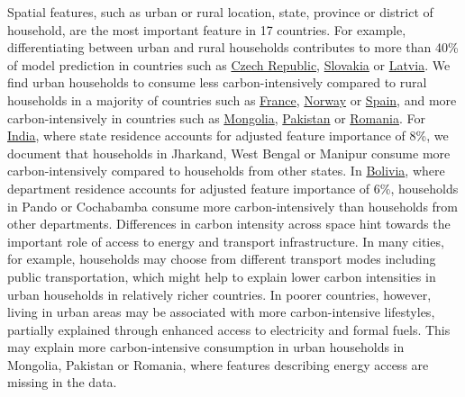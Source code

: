 \documentclass[12pt, a4paper]{article}
\begin{document}
Spatial features, such as urban or rural location, state, province or district of household, are the most important feature in 17 countries. For example, differentiating between urban and rural households contributes to more than 40\% of model prediction in countries such as \hyperref[fig:5b_CZE]{Czech Republic}, \hyperref[fig:5b_SVK]{Slovakia} or \hyperref[fig:5b_LVA]{Latvia}. We find urban households to consume less carbon-intensively compared to rural households in a majority of countries such as \hyperref[fig:5b_FRA]{France}, \hyperref[fig:5b_NOR]{Norway} or \hyperref[fig:5b_ESP]{Spain}, and more carbon-intensively in countries such as \hyperref[fig:5b_MNG]{Mongolia}, \hyperref[fig:5b_PAK]{Pakistan} or \hyperref[fig:5b_ROU]{Romania}. For \hyperref[fig:5b_IND]{India}, where state residence accounts for adjusted feature importance of 8\%, we document that households in Jharkand, West Bengal or Manipur consume more carbon-intensively compared to households from other states. In \hyperref[fig:5b_BOL]{Bolivia}, where department residence accounts for adjusted feature importance of 6\%, households in Pando or Cochabamba consume more carbon-intensively than households from other departments. Differences in carbon intensity across space hint towards the important role of access to energy and transport infrastructure. In many cities, for example, households may choose from different transport modes including public transportation, which might help to explain lower carbon intensities in urban households in relatively richer countries. In poorer countries, however, living in urban areas may be associated with more carbon-intensive lifestyles, partially explained through enhanced access to electricity and formal fuels. This may explain more carbon-intensive consumption in urban households in Mongolia, Pakistan or Romania, where features describing energy access are missing in the data.
\end{document}
